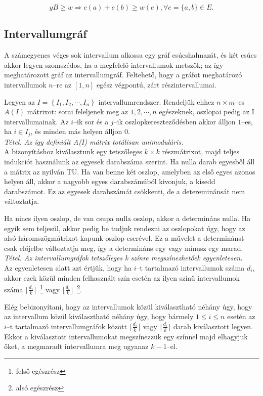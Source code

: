 \[ yB \geq w \Rightarrow c(a) + c(b) \geq w(e), \forall e=\{a,b\}\in E.\]

\subsection{Intervallumgráf}

A számegyenes véges sok intervallum alkossa egy gráf csúcshalmazát, és két csúcs
akkor legyen szomszédos, ha a megfelelő intervallumok metszők; az így
meghatározott gráf az intervallumgráf. Feltehető, hogy a gráfot meghatározó
intervallumok $n$--re az $[1,n]$ egész végpontú, zárt részintervallumai.

Legyen az $I=\left\{I_1, I_2, \cdots, I_n\right\}$ intervallumrendszer.
Rendeljük ehhez $n \times m$--es $A(I)$ mátrixot: sorai feleljenek meg az
$1,2,\cdots,n$ egészeknek, oszlopai pedig az I intervallumainak. Az $i$--ik sor
és a $j$--ik oszlopkereszteződésben akkor álljon $1$--es, ha $i \in I_j$, és
minden más helyen álljon $0$. \\

\emph{Tétel. Az így definiált A(I) mátrix totálisan unimoduláris.} \\

A bizonyításhoz kiválasztunk egy tetszőleges $k \times k$ részmátrixot, majd
teljes indukciót használunk az egyesek darabszáma szerint. Ha nulla darab
egyesből áll a mátrix az nyilván TU. Ha van benne két oszlop, amelyben az első
egyes azonos helyen áll, akkor a nagyobb egyes darabszámúból kivonjuk, a kisedd
darabszámot. Ez az egyesek darabszámát csökkenti, de a detereminánsát nem
változtatja.

Ha nincs ilyen oszlop, de van csupa nulla oszlop, akkor a determináns nulla. Ha
egyik sem teljesül, akkor pedig be tudjuk rendezni az oszlopokat úgy, hogy az
alsó háromszögmátrixot kapunk oszlop cserével. Ez a művelet a determinánst csak
előjelbe változtatja meg, így a determináns egy vagy mínusz egy marad. \\

\emph{Tétel. Az intervallumgráfok tetszőleges k színre megszínezhetőek
egyenletesen.}\\ 

Az egyenletesen alatt azt értjük, hogy ha $i$--t tartalmazó intervallumok száma
$d_i$, akkor ezek közül minden felhasznált szín esetén az ilyen színű
intervallumok száma $\lceil \frac{d_i}{k} \rceil$~\footnote{felső egészrész}
vagy $\lfloor \frac{d_i}{k} \rfloor$~\footnote{alsó egészrész}.

Elég bebizonyítani, hogy az intervallumok közül kiválasztható néhány úgy, hogy
az intervallum közül kiválasztható néhány úgy, hogy bármely $1 \leq i \leq n$
esetén az $i$--t tartalmazó intervallumgráfok között $\lceil \frac{d_i}{k}
\rceil$ vagy $\lfloor \frac{d_i}{k} \rfloor$ darab kiválasztott legyen. Ekkor a
kiválasztott intervallumokat megszínezzük egy színnel majd elhagyjuk őket, a
megmaradt intervallumra meg ugyanaz $k-1$--el.

